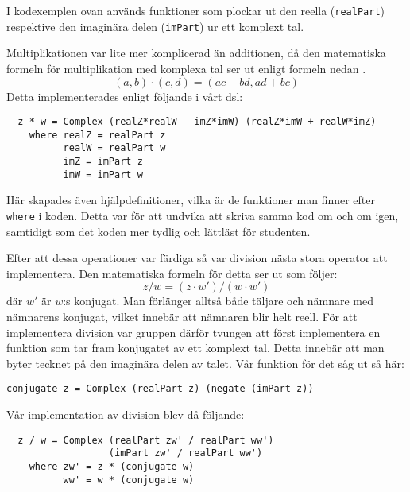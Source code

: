 \documentclass[12pt,a4paper,twoside,openright]{article}
\begin{document}
I kodexemplen ovan används funktioner som plockar ut den reella
(\texttt{realPart}) respektive den imaginära delen
(\texttt{imPart}) ur ett komplext tal.

Multiplikationen var lite mer komplicerad än additionen, då den
matematiska formeln för multiplikation med komplexa tal ser ut enligt
formeln nedan \cite{conway1978functions}.
\[(a, b) \cdot (c, d) = (ac - bd, ad + bc) \]
Detta implementerades enligt följande i vårt \gls{dsl}:
\begin{verbatim}
  z * w = Complex (realZ*realW - imZ*imW) (realZ*imW + realW*imZ)
    where realZ = realPart z
          realW = realPart w
          imZ = imPart z
          imW = imPart w
\end{verbatim}

Här skapades även hjälpdefinitioner, vilka är de funktioner man finner
efter \texttt{where} i koden. Detta var för att undvika
att skriva samma kod om och om igen, samtidigt som det koden mer
tydlig och lättläst för studenten.

Efter att dessa operationer var färdiga så var division nästa stora
operator att implementera. Den matematiska formeln för detta ser ut
som följer:
\[ z / w = (z \cdot w') / (w \cdot w') \]
där \(w'\) är \(w\):s
konjugat. Man förlänger alltså både täljare och nämnare med nämnarens
konjugat, vilket innebär att nämnaren blir helt reell. För att
implementera division var gruppen därför tvungen att först
implementera en funktion som tar fram konjugatet av ett komplext
tal. Detta innebär att man byter tecknet på den imaginära delen av
talet. Vår funktion för det såg ut så här:

\begin{verbatim}
conjugate z = Complex (realPart z) (negate (imPart z))
\end{verbatim}
Vår implementation av division blev då följande:

\begin{verbatim}
  z / w = Complex (realPart zw' / realPart ww')
                  (imPart zw' / realPart ww')
    where zw' = z * (conjugate w)
          ww' = w * (conjugate w)
\end{verbatim}
\end{document}

